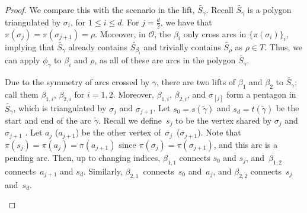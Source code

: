 \documentclass[pdftex]{sigma}%
\numberwithin{equation}{section}
\begin{document}
\begin{proof}
We compare this with the scenario in the lift, $\widetilde{S_\gamma}$. Recall $\widetilde{S_\gamma}$ is a polygon triangulated by $\sigma_i$, for $1 \leq i \leq d$. For $j = \frac{d}{2}$, we have that $\pi(\sigma_j) = \pi(\sigma_{j+1}) = \rho$. Moreover, in $\mathcal{O}$, the $\beta_i$ only cross arcs in $\{\pi(\sigma_i)\}_i$, implying that $\widetilde{S_\gamma}$ already contains $\widetilde{S_{\beta_i}}$ and trivially contains $\widetilde{S_\rho}$ as $\rho \in T$. Thus, we can apply $\phi_\gamma$ to $\beta_i$ and $\rho$, as all of these are arcs in the polygon $\widetilde{S_\gamma}$.

 Due to the symmetry of arcs crossed by $\gamma$, there are two lifts of $\beta_1$ and $\beta_2$ to $\widetilde{S_\gamma}$; call them $\beta_{1,i}$, $\beta_{2,i}$ for $i = 1,2$. Moreover, $\beta_{1,i}$, $\beta_{2,i}$, and $\sigma_{[j]}$ form a pentagon in $\widetilde{S_\gamma}$, which is triangulated by $\sigma_j$ and $\sigma_{j+1}$. Let $s_0 = s(\widetilde{\gamma})$ and $s_d = t(\widetilde{\gamma})$ be the start and end of the arc $\widetilde{\gamma}$. Recall we define~$s_j$ to be the vertex shared by $\sigma_j$ and $\sigma_{j+1}$ . Let $a_j$ ($a_{j+1}$) be the other vertex of~$\sigma_j$~($\sigma_{j+1}$). Note that $\pi(s_j) = \pi(a_j) = \pi(a_{j+1})$ since $\pi(\sigma_j) = \pi(\sigma_{j+1})$, and this arc is a pending arc. Then, up to changing indices, $\beta_{1,1}$ connects $s_0$ and $s_j$, and~$\beta_{1,2}$ connects~$a_{j+1}$ and $s_d$. Similarly, $\beta_{2,1}$~connects~$s_0$ and~$a_j$, and $\beta_{2,2}$ connects~$s_j$ and~$s_d$.

\begin{center}
\end{center}


\end{proof}
\end{document}
